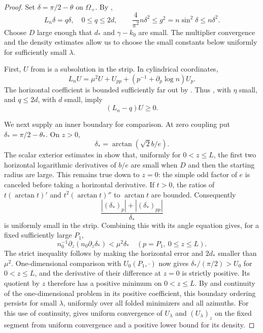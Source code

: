 \begin{proof}
Set \(\delta=\pi/2-\theta\) on \(\Omega_+\).
By ,
\[
 L_n\delta=q\delta,\quad 0\le q\le2d,\qquad
 \frac4{\pi^2}n\delta^2\le g^2=n\sin^2\delta\le n\delta^2.
\]
Choose \(D\) large enough that \(d_*\) and \(\gamma-k_0\) are small.
The multiplier convergence and the density estimates
 allow us to choose the small
constants below uniformly for sufficiently small \(\lambda\).

First, \(U\) from  is a subsolution in the
strip.  In cylindrical coordinates,
\[
 L_nU=\mu^2U+U_{pp}
          +(p^{-1}+\partial_p\log n)U_p.
\]
The horizontal coefficient is bounded sufficiently far out by
.  Thus
, with \(\eta\) small, and
\(q\le2d\), with \(d\) small, imply
\begin{equation}\label{eq:strip-subsolution}
 (L_n-q)U\ge0.
\end{equation}

We next supply an inner boundary for comparison.  At zero coupling
put \(\delta_*=\pi/2-\theta_*\).  On \(z>0\),
\[
 \delta_*=\arctan(\sqrt2 b/e).
\]
The scalar exterior estimates in
 show that, uniformly for
\(0<z\le L\), the first two horizontal logarithmic derivatives of
\(b/e\) are small when \(D\) and then the starting radius are large.
This remains true down to \(z=0\): the simple odd factor of \(e\)
is canceled before taking a horizontal derivative.
If \(t>0\), the ratios of
\(t(\arctan t)'\) and \(t^2(\arctan t)''\) to \(\arctan t\)
are bounded.  Consequently
\[
 \frac{|(\delta_*)_p|+|(\delta_*)_{pp}|}{\delta_*}
\]
is uniformly small in the strip.  Combining this with its angle
equation gives, for a fixed sufficiently large \(P_1\),
\begin{equation}\label{eq:inner-strip-inequality}
 n_0^{-1}\partial_z(n_0\partial_z\delta_*)
       <\mu^2\delta_*
       \quad(p=P_1,\ 0\le z\le L).
\end{equation}
The strict inequality follows by making the horizontal error and
\(2d_*\) smaller than \(\mu^2\).
One-dimensional comparison with \(U_0(P_1,\cdot)\) now gives
\(\delta_*/(\pi/2)>U_0\) for \(0<z\le L\), and the derivative of
their difference at \(z=0\) is strictly positive.
Its quotient by \(z\) therefore has a positive minimum on
\(0<z\le L\).  By  and continuity of the
one-dimensional problem in its positive coefficient, this boundary
ordering persists for small \(\lambda\), uniformly over all folded
minimizers and all azimuths.
For this use of continuity,  gives uniform
convergence of \(U_\lambda\) and \((U_\lambda)_z\) on the fixed segment
from uniform convergence and a positive lower bound for its density.


\end{proof}
